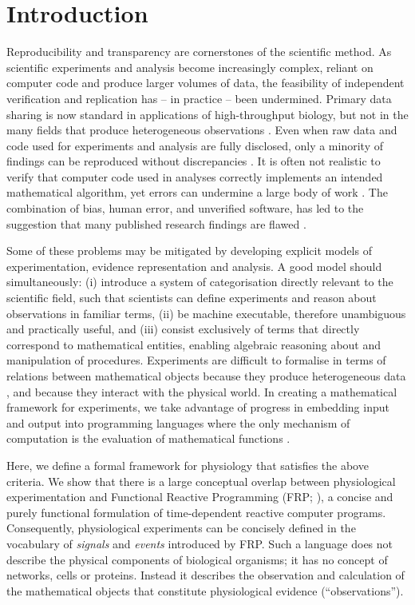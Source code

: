 \documentclass[11pt]{article}
\begin{document}
\pagebreak

\section*{Introduction}

Reproducibility and transparency are cornerstones of the scientific
method. As scientific experiments and analysis become increasingly
complex, reliant on computer code and produce larger volumes of data,
the feasibility of independent verification and replication has -- in
practice -- been undermined. Primary data sharing is now standard in
applications of high-throughput biology, but not in the many fields
that produce heterogeneous observations \citep{Gardner2005,
  Tukey1962}. Even when raw data and code used for experiments and
analysis are fully disclosed, only a minority of findings can be
reproduced without discrepancies \citep{Ioannidis2008,Baggerly2009,
  McCullough2007}. It is often not realistic to verify that computer
code used in analyses correctly implements an intended mathematical
algorithm, yet errors can undermine a large body of work
\citep{Chang2006}. The combination of bias, human error, and unverified
software, has led to the suggestion that many published research
findings are flawed \citep{Ioannidis2005, Merali2010}.

Some of these problems may be mitigated by developing explicit models
of experimentation, evidence representation and analysis. A good model
should simultaneously: (i) introduce a system of categorisation
directly relevant to the scientific field, such that scientists can
define experiments and reason about observations in familiar terms,
(ii) be machine executable, therefore unambiguous and practically
useful, and (iii) consist exclusively of terms that directly
correspond to mathematical entities, enabling algebraic reasoning
about and manipulation of procedures.  Experiments are difficult to
formalise in terms of relations between mathematical objects because
they produce heterogeneous data \citep{Tukey1962}, and because they
interact with the physical world. In creating a mathematical framework
for experiments, we take advantage of progress in embedding input and
output \citep{PeytonJones2002, Wadler1995} into programming languages
where the only mechanism of computation is the evaluation of
mathematical functions \citep{Church1941}.

Here, we define a formal framework for physiology
that satisfies the above criteria. We show that there
is a large conceptual overlap between physiological experimentation
and Functional Reactive Programming (FRP; \citep{Elliott1997,
  Nilsson2002}), a concise and purely functional formulation of
time-dependent reactive computer programs. Consequently, physiological
experiments can be concisely defined in the vocabulary of
\emph{signals} and \emph{events} introduced by FRP. Such a language
does not describe the physical components of biological organisms; it
has no concept of networks, cells or proteins. Instead it describes
the observation and calculation of the mathematical objects that
constitute physiological evidence (``observations'').
\end{document}
